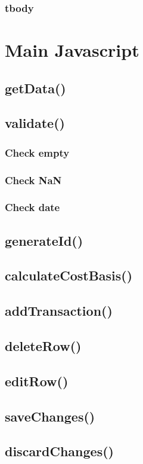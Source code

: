 \documentclass[letterpaper]{article}
\begin{document}
\subsubsection{tbody}

\newpage

\section{Main Javascript}\label{JS}
\subsection{getData()}
\subsection{validate()}
\subsubsection{Check empty}
\subsubsection{Check NaN}
\subsubsection{Check date}
\subsection{generateId()}
\subsection{calculateCostBasis()}
\subsection{addTransaction()}
\subsection{deleteRow()}
\subsection{editRow()}
\subsection{saveChanges()}
\subsection{discardChanges()}
\end{document}
